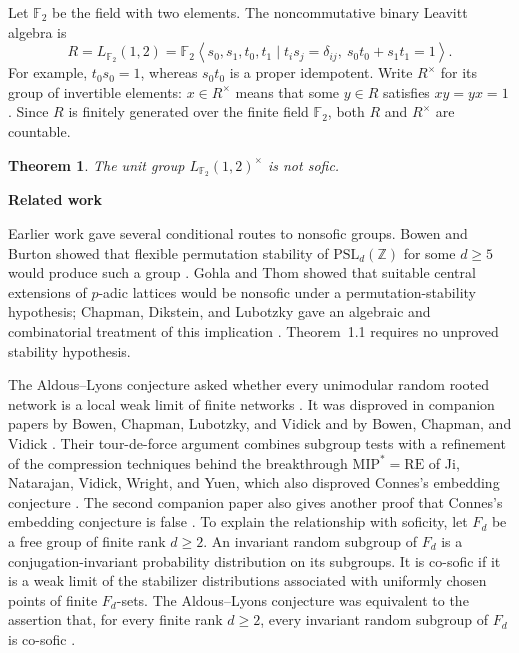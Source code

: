\documentclass[10pt]{article}
\newtheorem{theorem}{Theorem}[section]
\newcommand{\F}{\mathbb{F}}
\newcommand{\Z}{\mathbb{Z}}
\newcommand{\subhead}[1]{\par\medskip\noindent\textbf{#1}\par\smallskip}
\newcommand{\angles}[1]{\left\langle #1\right\rangle}
\begin{document}
Let $\F_2$ be the field with two elements. The noncommutative binary Leavitt algebra \cite{Lea62} is
\begin{equation}
R=L_{\F_2}(1,2)=\F_2\angles{s_0,s_1,t_0,t_1\mid t_i s_j=\delta_{ij},\ s_0t_0+s_1t_1=1}.
\tag{1}
\end{equation}
For example, $t_0s_0=1$, whereas $s_0t_0$ is a proper idempotent. Write $R^\times$ for its group of invertible elements: $x\in R^\times$ means that some $y\in R$ satisfies $xy=yx=1$. Since $R$ is finitely generated over the finite field $\F_2$, both $R$ and $R^\times$ are countable.

\begin{theorem}
The unit group $L_{\F_2}(1,2)^\times$ is not sofic.
\end{theorem}

\subhead{Related work}
Earlier work gave several conditional routes to nonsofic groups. Bowen and Burton showed that flexible permutation stability of $\mathrm{PSL}_d(\Z)$ for some $d\geq 5$ would produce such a group \cite{BB20}. Gohla and Thom showed that suitable central extensions of $p$-adic lattices would be nonsofic under a permutation-stability hypothesis; Chapman, Dikstein, and Lubotzky gave an algebraic and combinatorial treatment of this implication \cite{GT24,CDL24}. Theorem~1.1 requires no unproved stability hypothesis.

The Aldous--Lyons conjecture asked whether every unimodular random rooted network is a local weak limit of finite networks \cite[Question~10.1]{AL07}. It was disproved in companion papers by Bowen, Chapman, Lubotzky, and Vidick and by Bowen, Chapman, and Vidick \cite{BCLV24,BCV25}. Their tour-de-force argument combines subgroup tests with a refinement of the compression techniques behind the breakthrough $\mathrm{MIP}^{\ast}=\mathrm{RE}$ of Ji, Natarajan, Vidick, Wright, and Yuen, which also disproved Connes's embedding conjecture \cite{JNVWY20}. The second companion paper also gives another proof that Connes's embedding conjecture is false \cite{BCV25}. To explain the relationship with soficity, let $F_d$ be a free group of finite rank $d\geq 2$. An invariant random subgroup of $F_d$ is a conjugation-invariant probability distribution on its subgroups. It is co-sofic if it is a weak limit of the stabilizer distributions associated with uniformly chosen points of finite $F_d$-sets. The Aldous--Lyons conjecture was equivalent to the assertion that, for every finite rank $d\geq 2$, every invariant random subgroup of $F_d$ is co-sofic \cite[Section~6]{Gel18}.
\end{document}
